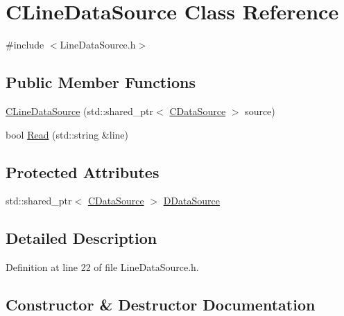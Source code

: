 \hypertarget{classCLineDataSource}{}\section{C\+Line\+Data\+Source Class Reference}
\label{classCLineDataSource}


{\ttfamily \#include $<$Line\+Data\+Source.\+h$>$}

\subsection*{Public Member Functions}
\begin{DoxyCompactItemize}
\item 
\hyperlink{classCLineDataSource_ae304217b213b06d75d0ea417840af8ee}{C\+Line\+Data\+Source} (std\+::shared\+\_\+ptr$<$ \hyperlink{classCDataSource}{C\+Data\+Source} $>$ source)
\item 
bool \hyperlink{classCLineDataSource_a569f5a9732d73ac8813c0ba4860e2e66}{Read} (std\+::string \&line)
\end{DoxyCompactItemize}
\subsection*{Protected Attributes}
\begin{DoxyCompactItemize}
\item 
std\+::shared\+\_\+ptr$<$ \hyperlink{classCDataSource}{C\+Data\+Source} $>$ \hyperlink{classCLineDataSource_a976b7e02379cb8b29eb16cfedd1352cb}{D\+Data\+Source}
\end{DoxyCompactItemize}


\subsection{Detailed Description}


Definition at line 22 of file Line\+Data\+Source.\+h.



\subsection{Constructor \& Destructor Documentation}
\hypertarget{classCLineDataSource_ae304217b213b06d75d0ea417840af8ee}{}\label{classCLineDataSource_ae304217b213b06d75d0ea417840af8ee} 
